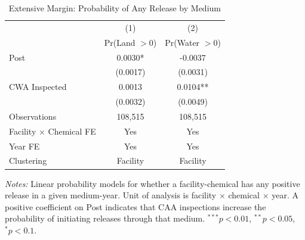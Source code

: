 \begin{table}[htbp]
\centering
\caption{Extensive Margin: Probability of Any Release by Medium}
\label{tab:extensive}
\begin{tabular}{lcc}
\toprule
& (1) & (2) \\
& Pr(Land $> 0$) & Pr(Water $> 0$) \\
\midrule
Post & 0.0030* & -0.0037 \\
& (0.0017) & (0.0031) \\[6pt]
CWA Inspected & 0.0013 & 0.0104** \\
& (0.0032) & (0.0049) \\[6pt]
\midrule
Observations & 108,515 & 108,515 \\
Facility $\times$ Chemical FE & Yes & Yes \\
Year FE & Yes & Yes \\
Clustering & Facility & Facility \\
\bottomrule
\end{tabular}
\begin{minipage}{0.95\textwidth}
\vspace{0.3em}
\footnotesize \textit{Notes:} Linear probability models for whether a facility-chemical has any positive release in a given medium-year. Unit of analysis is facility $\times$ chemical $\times$ year. A positive coefficient on Post indicates that CAA inspections increase the probability of initiating releases through that medium. $^{***}p<0.01$, $^{**}p<0.05$, $^{*}p<0.1$.
\end{minipage}
\end{table}
